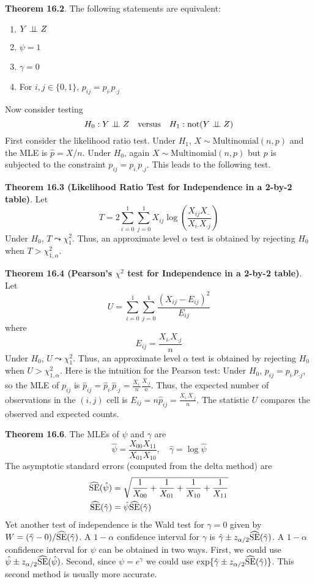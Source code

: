 \textbf{Theorem 16.2}. The following statements are equivalent:
\begin{enumerate}[tightlist,label={\arabic*.}]
\item
  \(Y \perp\!\!\!\perp Z\)
\item
  \(\psi = 1\)
\item
  \(\gamma = 0\)
\item
  For \(i, j \in \{ 0, 1 \}\), \(p_{ij} = p_{i\text{·}} p_{\text{·}j}\)
\end{enumerate}
Now consider testing
\[
H_{0}: Y \perp\!\!\!\perp Z
\quad \text{versus} \quad
H_{1}: \text{not} (Y \perp\!\!\!\perp Z)
\]
First consider the likelihood ratio test. Under \(H_{1}\),
\(X \sim \text{Multinomial}(n, p)\) and the MLE is \(\hat{p} = X / n\).
Under \(H_{0}\), again \(X \sim \text{Multinomial}(n, p)\) but \(p\) is
subjected to the constraint \(p_{ij} = p_{i.} p_{.j}\). This leads to
the following test.

\textbf{Theorem 16.3 (Likelihood Ratio Test for Independence in a 2-by-2
table)}. Let
\[
T = 2 \sum_{i=0}^{1} \sum_{j=0}^{1} X_{ij} \log \left( \frac{X_{ij} X_{\text{··}}}{X_{i\text{·}} X_{\text{·}j}} \right)
\]
Under \(H_{0}\), \(T \leadsto \chi_{1}^{2}\). Thus, an approximate level
\(\alpha\) test is obtained by rejecting \(H_{0}\) when
\(T > \chi_{1, \alpha}^{2}\).

\textbf{Theorem 16.4 (Pearson's \(\chi^{2}\) test for Independence in a
2-by-2 table)}. Let
\[
U = \sum_{i=0}^{1} \sum_{j=0}^{1} \frac{(X_{ij} - E_{ij})^{2}}{E_{ij}}
\]
where
\[
E_{ij} = \frac{X_{i\text{·}} X_{\text{·}j}}{n}
\]
Under \(H_{0}\), \(U \leadsto \chi_{1}^{2}\). Thus, an approximate level
\(\alpha\) test is obtained by rejecting \(H_{0}\) when
\(U > \chi_{1, \alpha}^{2}\).
Here is the intuition for the Pearson test: Under \(H_{0}\),
\(p_{ij} = p_{i\text{·}} p_{\text{·}j}\), so the MLE of \(p_{ij}\) is
\(\hat{p}_{ij} = \hat{p}_{i\text{·}} \hat{p}_{\text{·}j} = \frac{X_{i\text{·}}}{n} \frac{X_{\text{·}j}}{n}\).
Thus, the expected number of observations in the \((i, j)\) cell is
\(E_{ij} = n \hat{p}_{ij} = \frac{X_{i\text{·}} X_{\text{·}j}}{n}\). The
statistic \(U\) compares the observed and expected counts.

\textbf{Theorem 16.6}. The MLEs of \(\psi\) and \(\gamma\) are
\[
\hat{\psi} = \frac{X_{00} X_{11}}{X_{01} X_{10}}
, \quad
\hat{\gamma} = \log \hat{\psi}
\]
The asymptotic standard errors (computed from the delta method) are
\begin{align*}
\widehat{\operatorname{\mathrm{SE}}}(\hat{\psi}) &= \sqrt{\frac{1}{X_{00}} + \frac{1}{X_{01}} + \frac{1}{X_{10}} + \frac{1}{X_{11}}}\\
\widehat{\operatorname{\mathrm{SE}}}(\hat{\gamma}) &= \hat{\psi} \widehat{\operatorname{\mathrm{SE}}}(\hat{\gamma})
\end{align*}
Yet another test of independence is the Wald test for \(\gamma = 0\)
given by \(W = (\hat{\gamma} - 0) / \widehat{\operatorname{\mathrm{SE}}}(\hat{\gamma})\).
A \(1 - \alpha\) confidence interval for \(\gamma\) is
\(\hat{\gamma} \pm z_{\alpha/2} \widehat{\operatorname{\mathrm{SE}}}(\hat{\gamma})\).
A \(1 - \alpha\) confidence interval for \(\psi\) can be obtained in two
ways. First, we could use
\(\hat{\psi} \pm z_{\alpha/2} \widehat{\operatorname{\mathrm{SE}}}(\hat{\psi})\). Second,
since \(\psi = e^{\gamma}\) we could use
\(\exp \{\hat{\gamma} \pm z_{\alpha/2} \widehat{\operatorname{\mathrm{SE}}}(\hat{\gamma})\}\).
This second method is usually more accurate.

